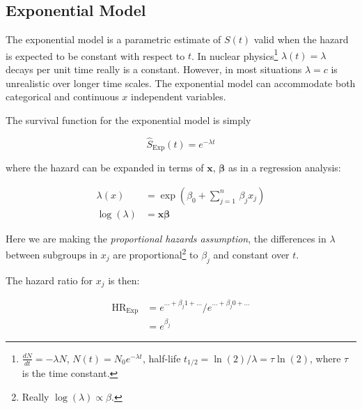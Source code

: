 \subsection{Exponential Model}
\label{additional:Survival:exp}
The exponential model is a parametric estimate of $S\left(t\right)$
valid when the hazard is expected to be constant with respect to $t$.
In nuclear physics\footnote{$\frac{dN}{dt} = -\lambda N$, $N\left(t\right) = N_{0} e^{-\lambda t}$, half-life $t_{1/2} = \ln\left(2\right) / \lambda = \tau \ln\left(2\right)$, where $\tau$ is the time constant.} $\lambda\left(t\right) = \lambda$
decays per unit time really is a constant.
However, in most situations $\lambda = c$ is unrealistic over longer time scales.
The exponential model can accommodate both categorical and continuous $x$ independent variables.

The survival function for the exponential model is simply

\begin{equation}\label{eq:Survival:exp}
\hat{S}_{\text{Exp}}\left(t\right) = e^{-\lambda t}
\end{equation}

\noindent where the hazard can be expanded in terms of $\mathbf{x}$, $\bm{\beta}$ as in a regression analysis:

\begin{equation}\label{eq:Survival:exp_lambda}
\begin{aligned}
\lambda\left(x\right) &= \exp\left(\beta_{0} + \sum_{j=1}^{n}\, \beta_{j} x_{j}\right) \\
\log\left(\lambda\right) &= \mathbf{x} \bm{\beta}
\end{aligned}
\end{equation}

\noindent Here we are making the {\em proportional hazards assumption},
\ie the differences in $\lambda$ between subgroups in $x_{j}$
are proportional\footnote{Really $\log\left(\lambda\right) \propto \beta$.} to $\beta_{j}$
and constant over $t$.

The hazard ratio for $x_{j}$ is then:

\begin{equation}\label{eq:Survival:exp_HR}
\begin{aligned}
\text{HR}_{\text{Exp}} &= e^{\ldots+\beta_{j} 1+\ldots} / e^{\ldots+\beta_{j} 0+\ldots} \\
&= e^{\beta_{j}}
\end{aligned}
\end{equation}

